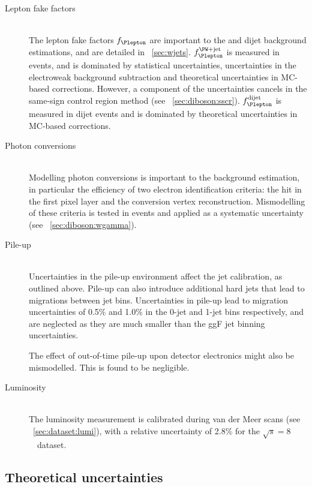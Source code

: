 \begin{description}
\item[Lepton fake factors] \hfill \\
	The lepton fake factors $f_{\Plepton}$ are important to the \Wjets and dijet background 
	estimations, and are detailed in \Section~\ref{sec:wjets}. $f_{\Plepton}^{\text{\Wjets}}$
	is measured in \Zjets events, and is dominated by statistical uncertainties, 
	uncertainties in the electroweak background subtraction and theoretical uncertainties in 
	MC-based corrections. However, a component of the uncertainties cancels in the same-sign 
	control region method (see \Section~\ref{sec:diboson:sscr}). 
	$f_{\Plepton}^{\text{dijet}}$ is measured in dijet events and is dominated by 
	theoretical uncertainties in MC-based corrections.

\item[Photon conversions] \hfill \\
	Modelling photon conversions is important to the \Wgamma background estimation, in 
	particular the efficiency of two electron identification criteria: the hit in the first 
	pixel layer and the conversion vertex reconstruction. Mismodelling of these criteria is 
	tested in \Zgamma events and applied as a systematic uncertainty (see 
	\Section~\ref{sec:diboson:wgamma}).

\item[Pile-up] \hfill \\
	Uncertainties in the pile-up environment affect the jet calibration, as outlined above. 
	Pile-up can also introduce additional hard jets that lead to migrations between jet bins.
	Uncertainties in pile-up lead to migration uncertainties of 0.5\% and 1.0\% in the 0-jet 
	and 1-jet bins respectively, and are neglected as they are much smaller than the ggF 
	jet binning uncertainties.

	The effect of out-of-time pile-up upon detector electronics might also be mismodelled. 
	This is found to be negligible.

\item[Luminosity] \hfill \\
	The luminosity measurement is calibrated during van der Meer scans (see 
	\Section~\ref{sec:dataset:lumi}), with a relative uncertainty of 2.8\% for the 
	\unit{$\sqrt{s} = 8$}{\TeV} dataset.

\end{description}



\subsection{Theoretical uncertainties}
\label{sec:syst:theor}

